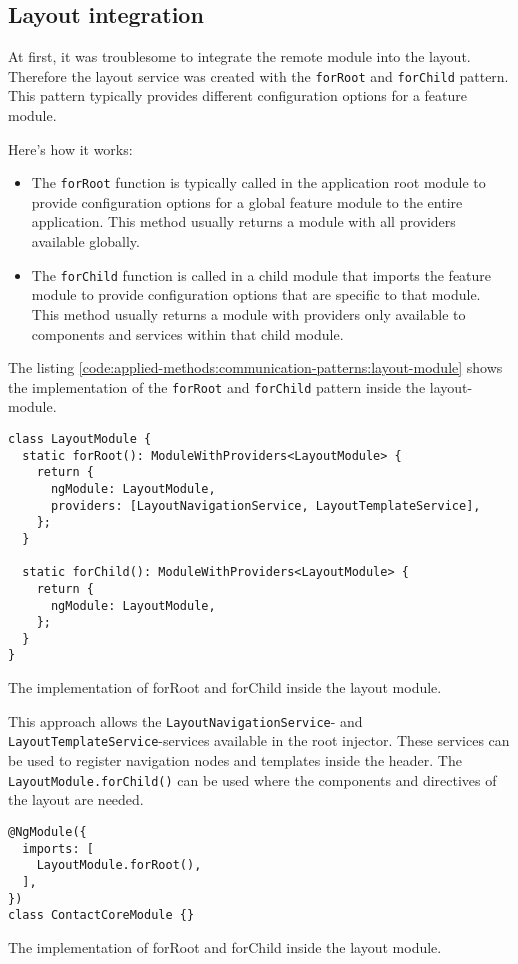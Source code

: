 \subsection{Layout integration}

At first, it was troublesome to integrate the remote module into the layout. Therefore the layout service was created with the \texttt{forRoot} and \texttt{forChild} pattern. This pattern typically provides different configuration options for a feature module.

\bigskip

\noindent Here's how it works:

\begin{itemize}
  \item The \texttt{forRoot} function is typically called in the application root module to provide configuration options for a global feature module to the entire application. This method usually returns a module with all providers available globally.
  \item The \texttt{forChild} function is called in a child module that imports the feature module to provide configuration options that are specific to that module. This method usually returns a module with providers only available to components and services within that child module.
\end{itemize}

\noindent The listing \ref{code:applied-methods:communication-patterns:layout-module} shows the implementation of the \texttt{forRoot} and \texttt{forChild} pattern inside the layout-module.

\ifshowListings
  \begin{listing}[H]
  \begin{verbatim}
class LayoutModule {
  static forRoot(): ModuleWithProviders<LayoutModule> {
    return {
      ngModule: LayoutModule,
      providers: [LayoutNavigationService, LayoutTemplateService],
    };
  }

  static forChild(): ModuleWithProviders<LayoutModule> {
    return {
      ngModule: LayoutModule,
    };
  }
}
  \end{verbatim}
  \caption{The implementation of forRoot and forChild inside the layout module.}\label{code:applied-methods:communication-patterns:layout-module}
  \end{listing}
\fi

\noindent This approach allows the \texttt{LayoutNavigationService}- and \texttt{LayoutTemplateService}-services available in the root injector. These services can be used to register navigation nodes and templates inside the header. The \texttt{LayoutModule.forChild()} can be used where the components and directives of the layout are needed.

\ifshowListings
  \begin{listing}[H]
  \begin{verbatim}
@NgModule({
  imports: [
    LayoutModule.forRoot(),
  ],
})
class ContactCoreModule {}
  \end{verbatim}
  \caption{The implementation of forRoot and forChild inside the layout module.}\label{code:applied-methods:communication-patterns:importing-the-root-layout-module}
  \end{listing}
\fi